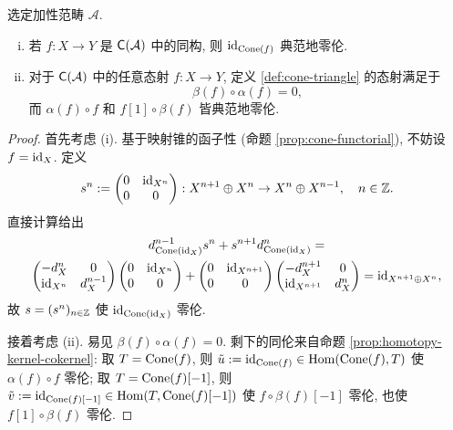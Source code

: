 \begin{proposition}\label{prop:cone-homotopy}
	选定加性范畴 $\mathcal{A}$.
	\begin{enumerate}[(i)]
		\item 若 $f: X \to Y$ 是 $\mathsf{C}(\mathcal{A})$ 中的同构, 则 $\mathrm{id}_{\operatorname{Cone}(f)}$ 典范地零伦.
		\item 对于 $\mathsf{C}(\mathcal{A})$ 中的任意态射 $f: X \to Y$, 定义 \ref{def:cone-triangle} 的态射满足于
		\[ \beta(f) \circ \alpha(f) = 0, \]
		而 $\alpha(f) \circ f$ 和 $f[1] \circ \beta(f)$ 皆典范地零伦.
	\end{enumerate}
\end{proposition}
\begin{proof}
	首先考虑 (i). 基于映射锥的函子性 (命题 \ref{prop:cone-functorial}), 不妨设 $f = \mathrm{id}_X$. 定义
	\[ s^n := \begin{pmatrix} 0 & \mathrm{id}_{X^n} \\ 0 & 0 \end{pmatrix} : X^{n+1} \oplus X^n \to X^n \oplus X^{n-1}, \quad n \in \mathbb{Z}. \]
	直接计算给出
	\begin{multline*}
		d^{n-1}_{\operatorname{Cone}(\mathrm{id}_X)} s^n + s^{n+1} d^n_{\operatorname{Cone}(\mathrm{id}_X)} = \\
		\begin{pmatrix} -d_X^n & 0 \\ \mathrm{id}_{X^n} & d_X^{n-1} \end{pmatrix} \begin{pmatrix} 0 & \mathrm{id}_{X^n} \\ 0 & 0 \end{pmatrix}  + \begin{pmatrix} 0 & \mathrm{id}_{X^{n+1}} \\ 0 & 0 \end{pmatrix} \begin{pmatrix} -d_X^{n+1} & 0 \\ \mathrm{id}_{X^{n+1}} & d_X^n \end{pmatrix}
		= \mathrm{id}_{X^{n+1} \oplus X^n},
	\end{multline*}
	故 $s = (s^n)_{n \in \mathbb{Z}}$ 使 $\mathrm{id}_{\operatorname{Cone}(\mathrm{id}_X)}$ 零伦.
	
	接着考虑 (ii). 易见 $\beta(f) \circ \alpha(f) = 0$. 剩下的同伦来自命题 \ref{prop:homotopy-kernel-cokernel}: 取 $T = \operatorname{Cone}(f)$, 则 $\tilde{u} := \mathrm{id}_{\operatorname{Cone}(f)} \in \operatorname{Hom}(\operatorname{Cone}(f), T)$ 使 $\alpha(f) \circ f$ 零伦; 取 $T = \operatorname{Cone}(f)[-1]$, 则 $\tilde{v} := \mathrm{id}_{\operatorname{Cone}(f)[-1]} \in \operatorname{Hom}(T, \operatorname{Cone}(f)[-1])$ 使 $f \circ \beta(f)[-1]$ 零伦, 也使 $f[1] \circ \beta(f)$ 零伦.
\end{proof}


